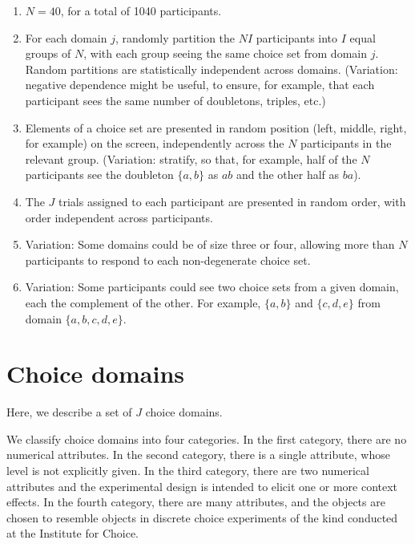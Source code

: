 \documentclass[11pt,letter]{amsart}
\begin{document}
\begin{enumerate}
\item $N=40$, for a total of 1040 participants. 

\item For each domain $j$, randomly partition the $NI$ participants into $I$
equal groups of $N$, with each group seeing the same choice set from domain $%
j$.  Random partitions are statistically independent across domains.
(Variation: negative dependence might be useful, to ensure, for example,
that each participant sees the same number of doubletons, triples, etc.)

\item Elements of a choice set are presented in random position (left,
middle, right, for example) on the screen, independently across the $N$
participants in the relevant group. (Variation: stratify, so that, for
example, half of the $N$ participants see the doubleton $\{a,b\}$ as $ab$
and the other half as $ba$).

\item The $J$ trials assigned to each participant are presented in random
order, with order independent across participants.

\item Variation: Some domains could be of size three or four, allowing more than $N$ participants to respond to each non-degenerate choice set.

\item Variation: Some participants could see two choice sets from a
given domain, each the complement of the other. For example, $\{a,b\}$ and $%
\{c,d,e\}$ from domain $\{a,b,c,d,e\}$.
\end{enumerate}

\section{Choice domains}

\label{s:domains}

Here, we describe a set of $J$ choice domains.

We classify choice domains into four categories. In the first category,
there are no numerical attributes. In the second category, there is a single
attribute, whose level is not explicitly given. In the third category, there
are two numerical attributes and the experimental design is intended to
elicit one or more context effects. In the fourth category, there are many
attributes, and the objects are chosen to resemble objects in discrete
choice experiments of the kind conducted at the Institute for Choice.
\end{document}
